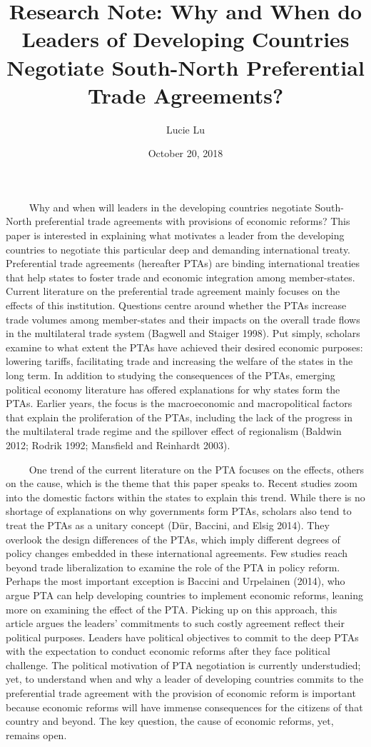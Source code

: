 \documentclass[12pt,]{article}
\title{Research Note: Why and When do Leaders of Developing Countries Negotiate
South-North Preferential Trade Agreements?}
\author{Lucie Lu}
\date{October 20, 2018}
\begin{document}
\maketitle

\(\qquad\) Why and when will leaders in the developing countries
negotiate South-North preferential trade agreements with provisions of
economic reforms? This paper is interested in explaining what motivates
a leader from the developing countries to negotiate this particular deep
and demanding international treaty. Preferential trade agreements
(hereafter PTAs) are binding international treaties that help states to
foster trade and economic integration among member-states. Current
literature on the preferential trade agreement mainly focuses on the
effects of this institution. Questions centre around whether the PTAs
increase trade volumes among member-states and their impacts on the
overall trade flows in the multilateral trade system (Bagwell and
Staiger 1998). Put simply, scholars examine to what extent the PTAs have
achieved their desired economic purposes: lowering tariffs, facilitating
trade and increasing the welfare of the states in the long term. In
addition to studying the consequences of the PTAs, emerging political
economy literature has offered explanations for why states form the
PTAs. Earlier years, the focus is the macroeconomic and macropolitical
factors that explain the proliferation of the PTAs, including the lack
of the progress in the multilateral trade regime and the spillover
effect of regionalism (Baldwin 2012; Rodrik 1992; Mansfield and
Reinhardt 2003).

\(\qquad\) One trend of the current literature on the PTA focuses on the
effects, others on the cause, which is the theme that this paper speaks
to. Recent studies zoom into the domestic factors within the states to
explain this trend. While there is no shortage of explanations on why
governments form PTAs, scholars also tend to treat the PTAs as a unitary
concept (Dür, Baccini, and Elsig 2014). They overlook the design
differences of the PTAs, which imply different degrees of policy changes
embedded in these international agreements. Few studies reach beyond
trade liberalization to examine the role of the PTA in policy reform.
Perhaps the most important exception is Baccini and Urpelainen (2014),
who argue PTA can help developing countries to implement economic
reforms, leaning more on examining the effect of the PTA. Picking up on
this approach, this article argues the leaders' commitments to such
costly agreement reflect their political purposes. Leaders have
political objectives to commit to the deep PTAs with the expectation to
conduct economic reforms after they face political challenge. The
political motivation of PTA negotiation is currently understudied; yet,
to understand when and why a leader of developing countries commits to
the preferential trade agreement with the provision of economic reform
is important because economic reforms will have immense consequences for
the citizens of that country and beyond. The key question, the cause of
economic reforms, yet, remains open.
\end{document}
